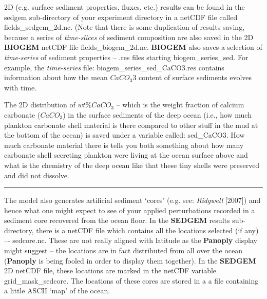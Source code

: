 \documentclass[11pt,fleqn]{book} %
\begin{document}
2D (e.g. surface sediment properties, fluxes, etc.) results can be found in  the \textsf{\footnotesize sedgem } sub-directory of your experiment directory  in a netCDF file called \textsf{\footnotesize fields\_sedgem\_2d.nc}. (Note that there is some duplication of results saving, because a series of \textit{time-slices} of sediment composition are also saved in the 2D \textbf{BIOGEM} netCDF file \textsf{\footnotesize fields\_biogem\_2d.nc}. \textbf{BIOGEM} also saves a selection of \textit{time-series }of sediment properties -- \textsf{\footnotesize .res } files starting \textsf{\footnotesize biogem\_series\_sed}. For example, the \textit{time-series} file: \textsf{\footnotesize biogem\_series\_sed\_CaCO3.res }  contains information about how the mean \(CaCO_{3}\)3 content of surface sediments evolves with time.

The 2D distribution of \(wt\% CaCO_{3}\) – which is the weight fraction of calcium carbonate (\(CaCO_{3}\)) in the surface sediments of the deep ocean (i.e., how much plankton carbonate shell material is there compared to other stuff in the mud at the bottom of the ocean) is saved under a variable called: \textsf{\footnotesize sed\_CaCO3}. How much carbonate material there is tells you both something about how many carbonate shell secreting plankton were living at the ocean surface above and what is the chemistry of the deep ocean like that these tiny shells were preserved and did not dissolve.

\vspace{1mm}
\noindent\rule{4cm}{0.1mm}
\vspace{2mm}

\noindent The model also generates artificial sediment ‘cores’ (e.g. see: \textit{Ridgwell} [2007]) and hence what one might expect to see of your applied perturbations recorded in a sediment core recovered from the ocean floor. In the \textbf{SEDGEM} results sub-directory, there is a netCDF file which contains all the locations selected (if any) –- \textsf{\footnotesize sedcore.nc}. These are not really aligned with latitude as the \textbf{Panoply} display might suggest – the locations are in fact distributed from all over the ocean (\textbf{Panoply} is being fooled in order to display them together). In the \textbf{SEDGEM} 2D netCDF file, these locations are marked in the netCDF variable \textsf{\footnotesize grid\_mask\_sedcore}. The locations of these cores are stored in a a file containing a little ASCII ‘map’ of the ocean.
\end{document}
